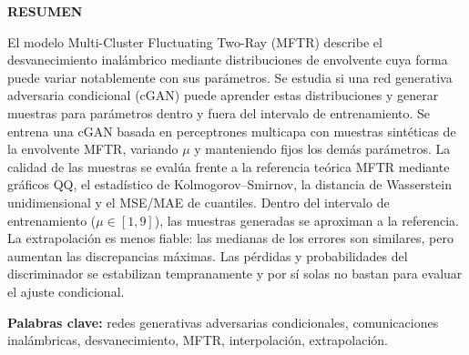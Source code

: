\begin{center}
    \textbf{\fontsize{14}{16}\selectfont RESUMEN}
\end{center}
\fontsize{12}{14}\selectfont
El modelo Multi-Cluster Fluctuating Two-Ray (MFTR) describe el desvanecimiento inalámbrico mediante distribuciones de envolvente cuya forma puede variar notablemente con sus parámetros. Se estudia si una red generativa adversaria condicional (cGAN) puede aprender estas distribuciones y generar muestras para parámetros dentro y fuera del intervalo de entrenamiento. Se entrena una cGAN basada en perceptrones multicapa con muestras sintéticas de la envolvente MFTR, variando $\mu$ y manteniendo fijos los demás parámetros. La calidad de las muestras se evalúa frente a la referencia teórica MFTR mediante gráficos QQ, el estadístico de Kolmogorov--Smirnov, la distancia de Wasserstein unidimensional y el MSE/MAE de cuantiles. Dentro del intervalo de entrenamiento ($\mu\in[1,9]$), las muestras generadas se aproximan a la referencia. La extrapolación es menos fiable: las medianas de los errores son similares, pero aumentan las discrepancias máximas. Las pérdidas y probabilidades del discriminador se estabilizan tempranamente y por sí solas no bastan para evaluar el ajuste condicional.

\vspace{10pt}
\begin{center}
    \textbf{Palabras clave:} redes generativas adversarias condicionales, comunicaciones inalámbricas, desvanecimiento, MFTR, interpolación, extrapolación.
\end{center}
